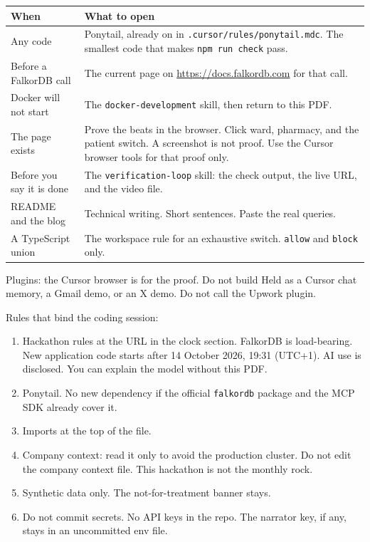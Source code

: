 \documentclass[11pt,a4paper]{article}
\newcommand{\code}[1]{\texttt{#1}}
\newcommand{\file}[1]{\texttt{#1}}
\begin{document}
\begin{center}
\begin{tabularx}{\textwidth}{@{}lX@{}}
\toprule
\textbf{When} & \textbf{What to open} \\
\midrule
Any code &
Ponytail, already on in \file{.cursor/rules/ponytail.mdc}. The smallest code that makes \code{npm run check} pass. \\
Before a FalkorDB call &
The current page on \url{https://docs.falkordb.com} for that call. \\
Docker will not start &
The \code{docker-development} skill, then return to this PDF. \\
The page exists &
Prove the beats in the browser. Click ward, pharmacy, and the patient switch. A screenshot is not proof. Use the Cursor browser tools for that proof only. \\
Before you say it is done &
The \code{verification-loop} skill: the check output, the live URL, and the video file. \\
README and the blog &
Technical writing. Short sentences. Paste the real queries. \\
A TypeScript union &
The workspace rule for an exhaustive switch. \code{allow} and \code{block} only. \\
\bottomrule
\end{tabularx}
\end{center}

Plugins: the Cursor browser is for the proof. Do not build Held as a Cursor chat memory, a Gmail demo, or an X demo. Do not call the Upwork plugin.

Rules that bind the coding session:

\begin{enumerate}
  \item Hackathon rules at the URL in the clock section. FalkorDB is load-bearing. New application code starts after 14 October 2026, 19:31 (UTC+1). AI use is disclosed. You can explain the model without this PDF.
  \item Ponytail. No new dependency if the official \code{falkordb} package and the MCP SDK already cover it.
  \item Imports at the top of the file.
  \item Company context: read it only to avoid the production cluster. Do not edit the company context file. This hackathon is not the monthly rock.
  \item Synthetic data only. The not-for-treatment banner stays.
  \item Do not commit secrets. No API keys in the repo. The narrator key, if any, stays in an uncommitted env file.
\end{enumerate}
\end{document}
